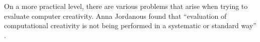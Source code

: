 \begin{comment}
  \begin{itemize}
  \item Can a machine judge whether a human is creative?
  \item Is creativity a property of machines (hardware or software?)
  \item Is mimicking human creativity really enough and appropriate?
  \item Compare against ``human creativity''? Or define machine creativity from scratch?
  \item Who is creative? The programmer or the program?
  \item Can creativity be objectively measured?
  \item Quantitative or qualitative?
  \item In respect to P or H creativity?
  \item Output minus input? (we don’t have the same strict judgement on humans)
  \item Is it the product or the process or both?
  \item Does context matter? (Blind deaf dumb person = computer?)
  \item Does time matter?
  \item Does purpose or intention matter?
  \item AGI vs AI? Artificial general creativity vs artificial creativity?
  \end{itemize}
\end{comment}

On a more practical level, there are various problems that arise when trying to evaluate computer creativity. Anna Jordanous found that ``evaluation of computational creativity is not being performed in a systematic or standard way'' \citep[p.2][her emphasis]{Jordanous2011}.

